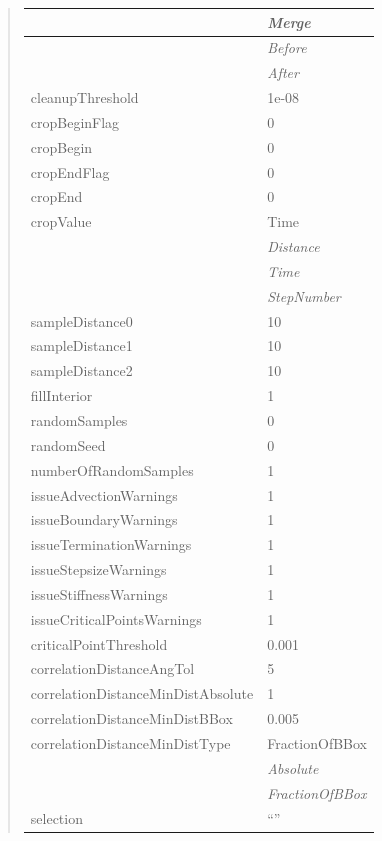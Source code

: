\documentclass[letterpaper,10pt,english]{sphinxmanual}
\begin{document}
\begin{quote}
\begin{longtable}{|l|l|}
\hline & 
\emph{Merge}
\\
\hline & 
\emph{Before}
\\
\hline & 
\emph{After}
\\
\hline
cleanupThreshold
 & 
1e-08
\\
\hline
cropBeginFlag
 & 
0
\\
\hline
cropBegin
 & 
0
\\
\hline
cropEndFlag
 & 
0
\\
\hline
cropEnd
 & 
0
\\
\hline
cropValue
 & 
Time
\\
\hline & 
\emph{Distance}
\\
\hline & 
\emph{Time}
\\
\hline & 
\emph{StepNumber}
\\
\hline
sampleDistance0
 & 
10
\\
\hline
sampleDistance1
 & 
10
\\
\hline
sampleDistance2
 & 
10
\\
\hline
fillInterior
 & 
1
\\
\hline
randomSamples
 & 
0
\\
\hline
randomSeed
 & 
0
\\
\hline
numberOfRandomSamples
 & 
1
\\
\hline
issueAdvectionWarnings
 & 
1
\\
\hline
issueBoundaryWarnings
 & 
1
\\
\hline
issueTerminationWarnings
 & 
1
\\
\hline
issueStepsizeWarnings
 & 
1
\\
\hline
issueStiffnessWarnings
 & 
1
\\
\hline
issueCriticalPointsWarnings
 & 
1
\\
\hline
criticalPointThreshold
 & 
0.001
\\
\hline
correlationDistanceAngTol
 & 
5
\\
\hline
correlationDistanceMinDistAbsolute
 & 
1
\\
\hline
correlationDistanceMinDistBBox
 & 
0.005
\\
\hline
correlationDistanceMinDistType
 & 
FractionOfBBox
\\
\hline & 
\emph{Absolute}
\\
\hline & 
\emph{FractionOfBBox}
\\
\hline
selection
 & 
``''
\\
\hline\end{longtable}

\end{quote}
\end{document}
